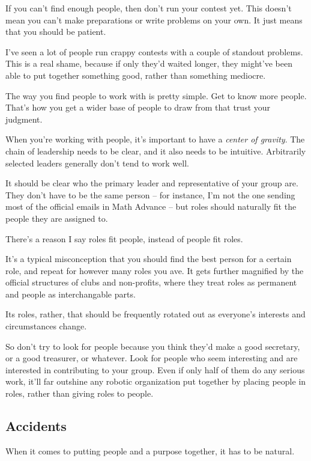\documentclass[points=false]{bounce}
\begin{document}
If you can't find enough people,
then don't run your contest yet.
This doesn't mean you can't make preparations
or write problems on your own.
It just means that you should be patient.

I've seen a lot of people run crappy contests
with a couple of standout problems.
This is a real shame, because if only they'd waited longer,
they might've been able to put together something good,
rather than something mediocre.

The way you find people to work with is pretty simple.
Get to know more people.
That's how you get a wider base of people to draw from
that trust your judgment.

When you're working with people,
it's important to have a \emph{center of gravity}.
The chain of leadership needs to be clear, and it also needs to be intuitive. Arbitrarily selected leaders generally don't tend to work well.

It should be clear who the primary leader and representative of your group are. They don't have to be the same person -- for instance, I'm not the one sending most of the official emails in Math Advance -- but roles should naturally fit the people they are assigned to.

There's a reason I say roles fit people, instead of people fit roles.

It's a typical misconception that you should find the best person for a certain role, and repeat for however many roles you ave.
It gets further magnified by the official structures of clubs and non-profits, where they treat roles as permanent and people as interchangable parts.

Its roles, rather, that should be frequently rotated out as everyone's interests and circumstances change.

So don't try to look for people because you think they'd make a good secretary, or a good treasurer, or whatever. Look for people who seem interesting and are interested in contributing to your group. Even if only half of them do any serious work, it'll far outshine any robotic organization put together by placing people in roles, rather than giving roles to people.

\subsection{Accidents}

When it comes to putting people and a purpose together,
it has to be natural.
\end{document}
